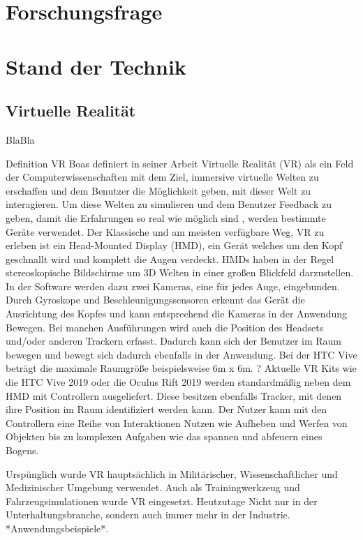 \chapter{Forschungsfrage}

\chapter{Stand der Technik}

\section{Virtuelle Realität}
BlaBla\cite{Dummer2009}

Definition VR
Boas definiert in  seiner Arbeit \cite{Boas2012} Virtuelle Realität (VR) als ein Feld der Computerwissenschaften mit dem Ziel, immersive virtuelle Welten zu erschaffen und dem Benutzer die Möglichkeit geben, mit dieser Welt zu interagieren. Um diese Welten zu simulieren und dem Benutzer Feedback zu geben, damit die Erfahrungen so real wie möglich sind , werden bestimmte Geräte verwendet.
Der Klassische und am meisten verfügbare Weg, VR zu erleben ist ein Head-Mounted Display (HMD), ein Gerät welches um den Kopf geschnallt wird und komplett die Augen verdeckt. HMDs haben in der Regel stereoskopische Bildschirme um 3D Welten in einer großen Blickfeld darzustellen. In der Software werden dazu zwei Kameras, eine für jedes Auge, eingebunden. Durch Gyroskope und Beschleunigungssensoren erkennt das Gerät die Ausrichtung des Kopfes und kann entsprechend die Kameras in der Anwendung Bewegen. Bei manchen Ausführungen wird auch die Position des Headsets und/oder anderen Trackern erfasst. Dadurch kann sich der Benutzer im Raum bewegen und bewegt sich dadurch ebenfalls in der Anwendung. \cite{Boas2012}\cite{Holloway1995} Bei der HTC Vive beträgt die maximale Raumgröße beispielsweise 6m x 6m. ?
Aktuelle VR Kits wie die HTC Vive 2019 oder die Oculus Rift 2019 werden standardmäßig neben dem HMD mit Controllern ausgeliefert. Diese besitzen ebenfalls Tracker, mit denen ihre Position im Raum identifiziert werden kann. Der Nutzer kann mit den Controllern eine Reihe von Interaktionen Nutzen wie Aufheben und Werfen von Objekten bis zu komplexen Aufgaben wie das spannen und abfeuern eines Bogens.

Urspünglich wurde VR hauptsächlich in Militärischer, Wissenschaftlicher und Medizinischer Umgebung verwendet. Auch als Trainingwerkzeug und Fahrzeugsimulationen wurde VR eingesetzt. Heutzutage 
 Nicht nur in der Unterhaltungsbranche, sondern auch immer mehr in der Industrie.\cite{Ragan2010} *Anwendungsbeispiele*.
 
